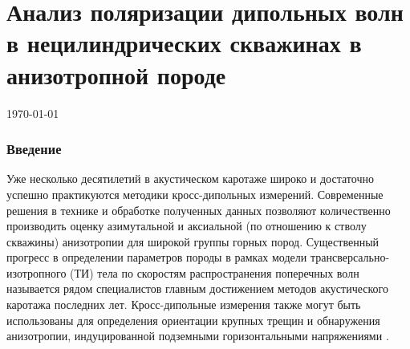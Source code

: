 \documentclass[a4paper,11pt]{article}
\begin{document}
\part*{Анализ поляризации дипольных волн в нецилиндрических скважинах в анизотропной породе}
\today

%
%
%
%

\section{Введение}
Уже несколько десятилетий в акустическом каротаже широко и достаточно успешно практикуются методики кросс-дипольных измерений. Современные решения в технике и обработке полученных данных позволяют количественно производить оценку азимутальной и аксиальной (по отношению к стволу скважины) анизотропии для широкой группы горных пород. Существенный прогресс в определении параметров породы в рамках модели трансверсально-изотропного (ТИ) тела по скоростям распространения поперечных волн называется рядом специалистов главным достижением методов акустического каротажа последних лет. Кросс-дипольные измерения также могут быть использованы для определения ориентации крупных трещин и обнаружения анизотропии, индуцированной подземными горизонтальными напряжениями \cite{Patterson2001}.
\end{document}
